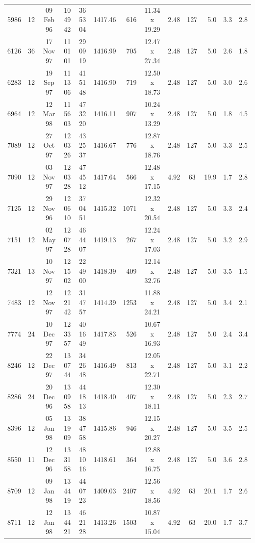 \documentclass{aa}
\begin{document}
\begin{table}
\begin{tabular}{ccccclrcccrcc}
5986 & 12 & 09 Feb 96 & 10 49 42 & 36 53 04 & 1417.46 &      616 & 11.34 x 19.29 & 2.48 & 127 & 5.0 & 3.3 & 2.8 \\
6126 & 36 & 17 Nov 97 & 11 01 01 & 29 09 19 & 1416.99 &      705 & 12.47 x 27.34 & 2.48 & 127 & 5.0 & 2.6 & 1.8 \\
6283 & 12 & 19 Sep 97 & 11 13 06 & 41 51 48 & 1416.90 &      719 & 12.50 x 18.73 & 2.48 & 127 & 5.0 & 3.0 & 2.6 \\
6964 & 12 & 12 Mar 98 & 11 56 03 & 47 32 20 & 1416.11 &      907 & 10.24 x 13.29 & 2.48 & 127 & 5.0 & 1.8 & 4.5 \\
7089 & 12 & 27 Oct 97 & 12 03 26 & 43 25 37 & 1416.67 &      776 & 12.87 x 18.76 & 2.48 & 127 & 5.0 & 3.3 & 2.5 \\
7090 & 12 & 03 Nov 97 & 12 03 28 & 47 45 12 & 1417.64 &      566 & 12.48 x 17.15 & 4.92 &  63 & 19.9 & 1.7 & 2.8 \\
7125 & 12 & 29 Nov 96 & 12 06 10 & 37 04 51 & 1415.32 &     1071 & 12.32 x 20.54 & 2.48 & 127 & 5.0 & 3.3 & 2.4 \\
7151 & 12 & 02 May 97 & 12 07 28 & 46 44 07 & 1419.13 &      267 & 12.24 x 17.03 & 2.48 & 127 & 5.0 & 3.2 & 2.9 \\
7321 & 13 & 10 Nov 97 & 12 15 02 & 22 49 00 & 1418.39 &      409 & 12.14 x 32.76 & 2.48 & 127 & 5.0 & 3.5 & 1.5 \\
7483 & 12 & 12 Nov 97 & 12 21 42 & 31 47 57 & 1414.39 &     1253 & 11.88 x 24.21 & 2.48 & 127 & 5.0 & 3.4 & 2.1 \\
7774 & 24 & 10 Dec 97 & 12 33 57 & 40 16 49 & 1417.83 &      526 & 10.67 x 16.93 & 2.48 & 127 & 5.0 & 2.4 & 3.4 \\
8246 & 12 & 22 Dec 97 & 13 07 44 & 34 26 48 & 1416.49 &      813 & 12.05 x 22.71 & 2.48 & 127 & 5.0 & 3.1 & 2.2 \\
8286 & 24 & 20 Dec 96 & 13 09 58 & 44 18 13 & 1418.40 &      407 & 12.30 x 18.11 & 2.48 & 127 & 5.0 & 2.3 & 2.7 \\
8396 & 12 & 05 Jan 98 & 13 19 09 & 38 47 58 & 1415.86 &      946 & 12.15 x 20.27 & 2.48 & 127 & 5.0 & 3.5 & 2.5 \\
8550 & 11 & 12 Dec 96 & 13 31 58 & 48 10 16 & 1418.61 &      364 & 12.88 x 16.75 & 2.48 & 127 & 5.0 & 3.6 & 2.8 \\
8709 & 12 & 09 Jan 98 & 13 44 19 & 44 07 23 & 1409.03 &     2407 & 12.56 x 18.56 & 4.92 &  63 & 20.1 & 1.7 & 2.6 \\
8711 & 12 & 12 Jan 98 & 13 44 21 & 46 21 28 & 1413.26 &     1503 & 10.87 x 15.04 & 4.92 &  63 & 20.0 & 1.7 & 3.7 \\

\end{tabular}
\end{table}
\end{document}
